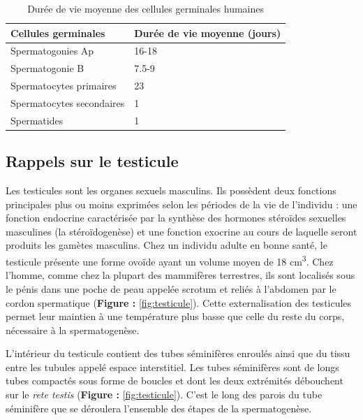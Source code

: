 \documentclass[12pt,a4paper,twoside]{ugathesis}
\theoremstyle{definition}
\theoremstyle{definition}
\theoremstyle{definition}
\theoremstyle{remark}
\begin{document}
\begin{longtable}[t]{ll}
\caption{\label{tab:spermatotime}Durée de vie moyenne des cellules germinales humaines}\\
\toprule
Cellules germinales & Durée de vie moyenne (jours)\\
\midrule
Spermatogonies Ap & 16-18\\
Spermatogonie B & 7.5-9\\
Spermatocytes primaires & 23\\
Spermatocytes secondaires & 1\\
Spermatides & 1\\
\bottomrule
\end{longtable}

\newpage

\subsection{Rappels sur le testicule}\label{rappels-sur-le-testicule}

Les testicules sont les organes sexuels masculins. Ils possèdent deux
fonctions principales plus ou moins exprimées selon les périodes de la
vie de l'individu : une fonction endocrine caractérisée par la synthèse
des hormones stéroïdes sexuelles masculines (la stéroïdogenèse) et une
fonction exocrine au cours de laquelle seront produits les gamètes
masculins. Chez un individu adulte en bonne santé, le testicule présente
une forme ovoïde ayant un volume moyen de 18 cm\textsuperscript{3}. Chez
l'homme, comme chez la plupart des mammifères terrestres, ils sont
localisés sous le pénis dans une poche de peau appelée scrotum et reliés
à l'abdomen par le cordon spermatique (\textbf{Figure :}
\ref{fig:testicule}). Cette externalisation des testicules permet leur
maintien à une température plus basse que celle du reste du corps,
nécessaire à la spermatogenèse.

L'intérieur du testicule contient des tubes séminifères enroulés ainsi
que du tissu entre les tubules appelé espace interstitiel. Les tubes
séminifères sont de longs tubes compactés sous forme de boucles et dont
les deux extrémités débouchent sur le \emph{rete testis} (\textbf{Figure
:} \ref{fig:testicule}). C'est le long des parois du tube séminifère que
se déroulera l'ensemble des étapes de la spermatogenèse.
\end{document}
